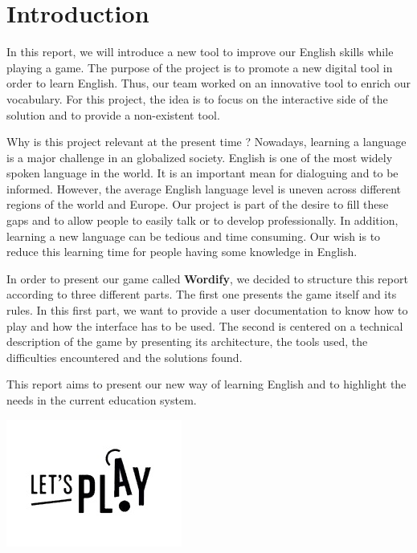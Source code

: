 \documentclass{tnreport}
\begin{document}
\maketitle

\cleardoublepage

\renewcommand{\baselinestretch}{0.5}\normalsize
\tableofcontents
\renewcommand{\baselinestretch}{1.0}\normalsize

\cleardoublepage

\chapter{Introduction}

In this report, we will introduce a new tool to improve our English skills while playing a game. The purpose of the project is to promote a new digital tool in order to learn English. Thus, our team worked on an innovative tool to enrich our vocabulary. For this project, the idea is to focus on the interactive side of the solution and to provide a non-existent tool. 

Why is this project relevant at the present time ? Nowadays, learning a language is a major challenge in an globalized society. English is one of the most widely spoken language in the world. It is an important mean for dialoguing and to be informed. However, the average English language level is uneven across different regions of the world and Europe. Our project is part of the desire to fill these gaps and to allow people to easily talk or to develop professionally. In addition, learning a new language can be tedious and time consuming. Our wish is to reduce this learning time for people having some knowledge in English. 

In order to present our game called \textbf{Wordify}, we decided to structure this report according to three different parts. The first one presents the game itself and its rules. In this first part, we want to provide a user documentation to know how to play and how the interface has to be used. The second is centered on a technical description of the game by presenting its architecture, the tools used, the difficulties encountered and the solutions found.

This report aims to present our new way of learning English and to highlight the needs in the current education system. 

\begin{center}
	\includegraphics{figures/lets_play}
\end{center} 
\end{document}
